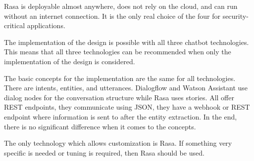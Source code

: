 Rasa is deployable almost anywhere, does not rely on the cloud, and can run without an internet connection. It is the only real choice of the four for security-critical applications.

The implementation of the design is possible with all three chatbot technologies.
This means that all three technologies can be recommended when only the implementation of the design is considered.

The basic concepts for the implementation are the same for all technologies.
There are intents, entities, and utterances.
Dialogflow and Watson Assistant use dialog nodes for the conversation structure while Rasa uses stories. 
All offer REST endpoints, they communicate using JSON, they have a webhook or REST endpoint where information is sent to after the entity extraction.
In the end, there is no significant difference when it comes to the concepts.

The only technology which allows customization is Rasa.
If something very specific is needed or tuning is required, then Rasa should be used.

